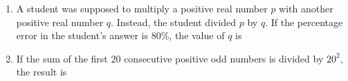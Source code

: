 \documentclass[journal,12pt,onecolumn]{IEEEtran}
\theoremstyle{remark}
\begin{document}
\begin{enumerate}
\item  A student was supposed to multiply a positive real number $p$ with another positive real number $q$. Instead, the student divided $p$ by $q$. If the percentage error in the student's answer is 80\%, the value of $q$ is
\begin{enumerate}
\end{enumerate}
\hfill{}



 \item If the sum of the first 20 consecutive positive odd numbers is divided by $20^2$, the result is
\begin{enumerate}
\end{enumerate}
\hfill{}




\end{enumerate}
\end{document}
